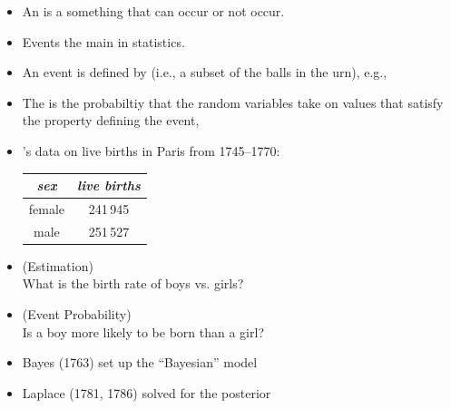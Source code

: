\documentclass[10pt]{report}
\begin{document}
%
\begin{itemize}
\item An  is a something that can occur or not occur.
\item Events the main  in statistics.
\item An event is defined by  (i.e., a subset of the balls in the urn), e.g., 
\item The  is the probabiltiy that the random
  variables take on values that satisfy the property defining the event,
\end{itemize}




\begin{itemize}
\item {}'s data on live births in Paris from 1745--1770:
\vspace*{-4pt}
\begin{center}\small
\begin{tabular}{c|c}
{\slshape sex} & {\slshape live births}
\\ \hline
female & 241\,945
\\
male & 251\,527
\end{tabular}
\end{center}
\item {} (Estimation)
\\
What is the birth rate of boys vs. girls?

\item {} (Event Probability)
\\
Is a boy more likely to be born than a girl?
%
\item Bayes (1763) set up the ``Bayesian'' model
\item Laplace (1781, 1786) solved for the posterior
\end{itemize}
\end{document}
